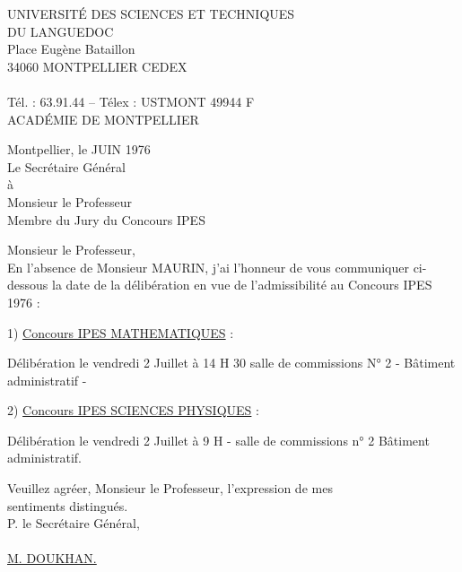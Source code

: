 
UNIVERSITÉ DES SCIENCES ET TECHNIQUES\\
DU LANGUEDOC\\
Place Eugène Bataillon\\
34060 MONTPELLIER CEDEX\\
\makebox[6cm]{\rule{1cm}{0.4pt}}\\
Tél. : 63.91.44 -- Télex : USTMONT 49944 F\\

ACADÉMIE DE MONTPELLIER\\
\makebox[7cm]{\rule{1.8cm}{0.4pt}}

Montpellier, le  JUIN 1976 \\

Le Secrétaire Général\\
à\\
Monsieur le Professeur \\
Membre du Jury du Concours IPES\\
\makebox[0pt][l]{\makebox[7cm]{\dotfill}}\hspace*{1.7cm}

Monsieur le Professeur,\\

En l'absence de Monsieur MAURIN, j'ai l'honneur de vous communiquer ci-dessous la date de la délibération en vue de l'admissibilité au Concours IPES 1976 :

1) \uline{Concours IPES MATHEMATIQUES} :

Délibération le vendredi 2 Juillet à 14 H 30 salle de commissions N° 2 - Bâtiment administratif -

2) \uline{Concours IPES SCIENCES PHYSIQUES} :

Délibération le vendredi 2 Juillet à 9 H - salle de commissions n° 2 Bâtiment administratif.

Veuillez agréer, Monsieur le Professeur, l'expression de mes\\
sentiments distingués.\\

P. le Secrétaire Général,\\
\\
\uline{M. DOUKHAN.}
